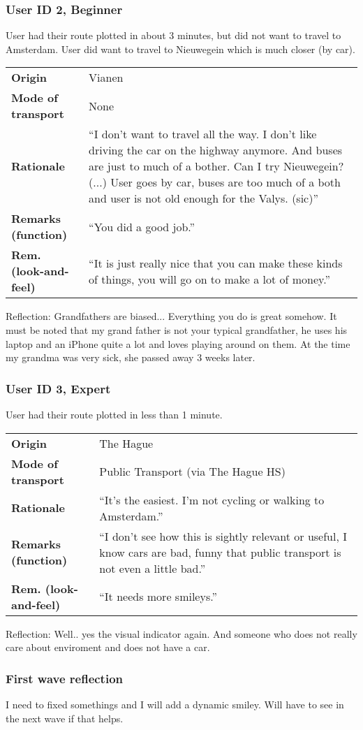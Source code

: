 \documentclass[final,a4paper,11pt]{article}
\newlength{\resulttablecolone}
\newlength{\resulttablecoltwo}
\begin{document}
\subsubsection*{User ID 2, Beginner}
User had their route plotted in about 3 minutes, but did not want to travel to Amsterdam. User did want to travel to Nieuwegein which is much closer (by car).
\begin{table}[H]
\begin{tabular}{p{\resulttablecolone}|p{\resulttablecoltwo}}
\textbf{Origin} & Vianen \\
\textbf{Mode of transport} & None \\
\textbf{Rationale} & ``I don't want to travel all the way. I don't like driving the car on the highway anymore. And buses are just to much of a bother. Can I try Nieuwegein? (...) User goes by car, buses are too much of a both and user is not old enough for the Valys. (sic)'' \\
\textbf{Remarks (function)} & ``You did a good job.'' \\
\textbf{Rem. (look-and-feel)} & ``It is just really nice that you can make these kinds of things, you will go on to make a lot of money.'' \\
\end{tabular}
\end{table}
Reflection: Grandfathers are biased... Everything you do is great somehow. It must be noted that my grand father is not your typical grandfather, he uses his laptop and an iPhone quite a lot and loves playing around on them. At the time my grandma was very sick, she passed away 3 weeks later.

\subsubsection*{User ID 3, Expert}
User had their route plotted in less than 1 minute.
\begin{table}[H]
\begin{tabular}{p{\resulttablecolone}|p{\resulttablecoltwo}}
\textbf{Origin} & The Hague \\
\textbf{Mode of transport} & Public Transport (via The Hague HS) \\
\textbf{Rationale} & ``It's the easiest. I'm not cycling or walking to Amsterdam.'' \\
\textbf{Remarks (function)} & ``I don't see how this is sightly relevant or useful, I know cars are bad, funny that public transport is not even a little bad.'' \\
\textbf{Rem. (look-and-feel)} & ``It needs more smileys.'' \\
\end{tabular}
\end{table}
Reflection: Well.. yes the visual indicator again. And someone who does not really care about enviroment and does not have a car.

\subsubsection*{First wave reflection}
I need to fixed somethings and I will add a dynamic smiley. Will have to see in the next wave if that helps.
\end{document}
